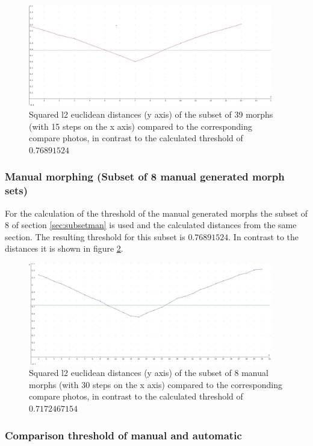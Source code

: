 \begin{figure}[htbp] 
	\centering
		\includegraphics[width=0.95\textwidth]{Resources/result39-90-10.jpg}
	\caption{Squared l2 euclidean distances (y axis) of the subset of 39 morphs (with 15 steps on the x axis) compared to the corresponding compare photos, in contrast to the calculated threshold of $0.76891524$} %
	\label{fig:Result39-90-10}
\end{figure}

\subsubsection{Manual morphing (Subset of 8 manual generated morph sets)}\label{sec:manmorph-thres}
For the calculation of the threshold of the manual generated morphs the subset of 8 of section \ref{sec:subsetman} is used and the calculated distances from the same section.
The resulting threshold for this subset is \textbf{$0.76891524$}. In contrast to the distances it is shown in figure \ref{fig:Resultman-90-10}.


\begin{figure}[htbp] 
	\centering
		\includegraphics[width=0.95\textwidth]{Resources/result-jannis-mean-90-10.jpg}
	\caption{Squared l2 euclidean distances (y axis) of the subset of 8 manual morphs (with 30 steps on the x axis) compared to the corresponding compare photos, in contrast to the calculated threshold of $0.7172467154$} %
	\label{fig:Resultman-90-10}
\end{figure}

\subsubsection{Comparison threshold of manual and automatic}\label{sec:comp-thres}


